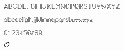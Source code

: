 \documentclass{article}
\begin{document}
$\mathbb{A} \mathbb{B} \mathbb{C} \mathbb{D} \mathbb{E} \mathbb{F} \mathbb{G} \mathbb{H} \mathbb{I} \mathbb{J} \mathbb{K} \mathbb{L} \mathbb{M} \mathbb{N} \mathbb{O} \mathbb{P} \mathbb{Q} \mathbb{R} \mathbb{S} \mathbb{T} \mathbb{U} \mathbb{V} \mathbb{W} \mathbb{X} \mathbb{Y} \mathbb{Z}$

$\mathbb{a} \mathbb{b} \mathbb{c} \mathbb{d} \mathbb{e} \mathbb{f} \mathbb{g} \mathbb{h} \mathbb{i} \mathbb{j} \mathbb{k} \mathbb{l} \mathbb{m} \mathbb{n} \mathbb{o} \mathbb{p} \mathbb{q} \mathbb{r} \mathbb{s} \mathbb{t} \mathbb{u} \mathbb{v} \mathbb{w} \mathbb{x} \mathbb{y} \mathbb{z}$

$\mathbb{0} \mathbb{1} \mathbb{2} \mathbb{3} \mathbb{4} \mathbb{5} \mathbb{6} \mathbb{7} \mathbb{8} \mathbb{9}$

$\cal{O}$
\end{document}
